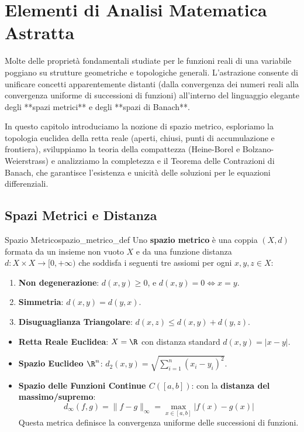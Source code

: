 \chapter{Elementi di Analisi Matematica Astratta}
\label{chap:analisi_astratta}

Molte delle proprietà fondamentali studiate per le funzioni reali di una variabile poggiano su strutture geometriche e topologiche generali. L'astrazione consente di unificare concetti apparentemente distanti (dalla convergenza dei numeri reali alla convergenza uniforme di successioni di funzioni) all'interno del linguaggio elegante degli **spazi metrici** e degli **spazi di Banach**.

In questo capitolo introduciamo la nozione di spazio metrico, esploriamo la topologia euclidea della retta reale (aperti, chiusi, punti di accumulazione e frontiera), sviluppiamo la teoria della compattezza (Heine-Borel e Bolzano-Weierstrass) e analizziamo la completezza e il Teorema delle Contrazioni di Banach, che garantisce l'esistenza e unicità delle soluzioni per le equazioni differenziali.

\section{Spazi Metrici e Distanza}
\label{sec:spazi_metrici_teoria}

\begin{definizione}{Spazio Metrico}{spazio_metrico_def}
Uno \textbf{spazio metrico} è una coppia $(X, d)$ formata da un insieme non vuoto $X$ e da una funzione distanza $d \colon X \times X \to [0, +\infty)$ che soddisfa i seguenti tre assiomi per ogni $x, y, z \in X$:
\begin{enumerate}
    \item \textbf{Non degenerazione}: $d(x, y) \ge 0$, e $d(x, y) = 0 \iff x = y$.
    \item \textbf{Simmetria}: $d(x, y) = d(y, x)$.
    \item \textbf{Disuguaglianza Triangolare}: $d(x, z) \le d(x, y) + d(y, z)$.
\end{enumerate}
\end{definizione}

\begin{metodo}
\begin{itemize}
    \item \textbf{Retta Reale Euclidea}: $X = \R$ con distanza standard $d(x, y) = |x - y|$.
    \item \textbf{Spazio Euclideo $\R^n$}: $d_2(x, y) = \sqrt{\sum_{i=1}^n (x_i - y_i)^2}$.
    \item \textbf{Spazio delle Funzioni Continue $C([a, b])$}: con la \textbf{distanza del massimo/supremo}:
    \[
        d_\infty(f, g) = \|f - g\|_\infty = \max_{x \in [a, b]} |f(x) - g(x)|
    \]
    Questa metrica definisce la convergenza uniforme delle successioni di funzioni.
\end{itemize}
\end{metodo}

